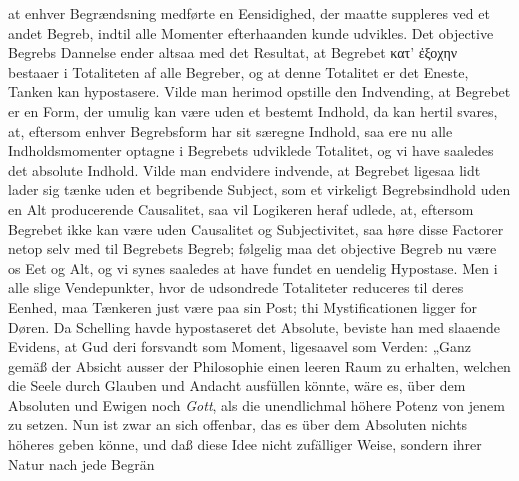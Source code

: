 \documentclass[12pt]{book}
\newcommand{\opage}[1]{\marginnote{\footnotesize\textit{[#1]}}}
\begin{document}
at enhver Begrændsning medførte en Eensidighed, der maatte suppleres ved et andet
Begreb, indtil alle Momenter efterhaanden kunde udvikles. Det objective Begrebs
Dannelse ender altsaa med det Resultat, at Begrebet κατ’ ἐξοχην bestaaer i Totaliteten
af alle Begreber, og at denne Totalitet er det Eneste, Tanken kan hypostasere. Vilde
man herimod opstille den Indvending, at Begrebet er en Form, der umulig kan være uden
et bestemt Indhold, da kan hertil svares, at, eftersom enhver Begrebsform har sit
særegne Indhold, saa ere nu alle Indholdsmomenter optagne i Begrebets udviklede
Totalitet, og vi have saaledes det absolute Indhold. Vilde man endvidere indvende, at
Begrebet ligesaa lidt lader sig tænke uden et begribende Subject, som et virkeligt
Begrebsindhold uden en Alt producerende Causalitet, saa vil Logikeren heraf udlede, at,
eftersom Begrebet ikke kan være uden Causalitet og Subjectivitet, saa høre disse
Factorer netop selv med til Begrebets Begreb; følgelig maa det objective Begreb nu være
os Eet og Alt, og vi synes saaledes at have fundet en uendelig Hypostase. Men i alle
slige Vendepunkter, hvor de udsondrede Totaliteter reduceres til deres Eenhed, maa
Tænkeren just være paa sin Post; thi Mystificationen ligger for Døren. Da Schelling
havde hypostaseret det Absolute, beviste han med slaaende Evidens, at Gud deri
forsvandt som Moment, ligesaavel som Verden: „Ganz gemäß der Absicht ausser der
Philosophie einen leeren Raum zu erhalten, welchen die Seele durch Glauben und Andacht
ausfüllen könnte, wäre es, über dem Absoluten und Ewigen noch \emph{Gott}, als die
unendlichmal höhere Potenz von jenem zu setzen. Nun ist zwar an sich offenbar, das es
über dem Absoluten nichts höheres geben könne, und daß diese Idee nicht zufälliger
Weise, sondern ihrer Natur nach jede Begrän%
\opage{181}%
%
\end{document}
